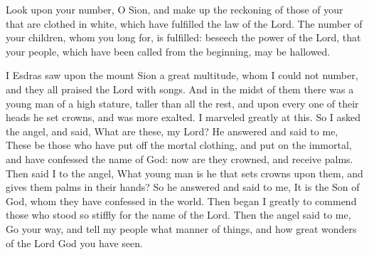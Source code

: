 { Look upon your number, O Sion, and make up the reckoning of those of your that are clothed in white, which have fulfilled the law of the Lord.
The number of your children, whom you long for, is fulfilled: beseech the power of the Lord, that your people, which have been called from the beginning, may be hallowed.
\par }{\PP {}I Esdras saw upon the mount Sion a great multitude, whom I could not number, and they all praised the Lord with songs.
And in the midst of them there was a young man of a high stature, taller than all the rest, and upon every one of their heads he set crowns, and was more exalted. I marveled greatly at this.
So I asked the angel, and said, What are these, my Lord?
He answered and said to me, These be those who have put off the mortal clothing, and put on the immortal, and have confessed the name of God: now are they crowned, and receive palms.
Then said I to the angel, What young man is he that sets crowns upon them, and gives them palms in their hands?
So he answered and said to me, It is the Son of God, whom they have confessed in the world. Then began I greatly to commend those who stood so stiffly for the name of the Lord.
Then the angel said to me, Go your way, and tell my people what manner of things, and how great wonders of the Lord God you have seen.

}
